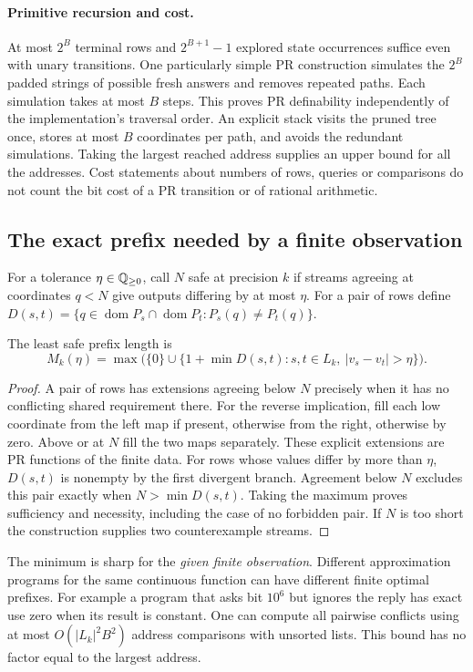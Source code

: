 \paragraph{Primitive recursion and cost.}
At most $2^B$ terminal rows and $2^{B+1}-1$ explored state occurrences suffice even with unary transitions. One particularly simple PR construction simulates the $2^B$ padded strings of possible fresh answers and removes repeated paths. Each simulation takes at most $B$ steps. This proves PR definability independently of the implementation's traversal order. An explicit stack visits the pruned tree once, stores at most $B$ coordinates per path, and avoids the redundant simulations. Taking the largest reached address supplies an upper bound for all the addresses. Cost statements about numbers of rows, queries or comparisons do not count the bit cost of a PR transition or of rational arithmetic.

\subsection{The exact prefix needed by a finite observation}
For a tolerance $\eta\in\mathbb{Q}_{\ge0}$, call $N$ safe at precision $k$ if streams agreeing at coordinates $q<N$ give outputs differing by at most $\eta$. For a pair of rows define $D(s,t)=\{q\in\operatorname{dom}P_s\cap\operatorname{dom}P_t:P_s(q)\ne P_t(q)\}$.
\begin{theorem}\label{thm:least}
The least safe prefix length is
\[
   M_k(\eta)=
   \max\bigl(\{0\}\cup
   \{1+\min D(s,t):s,t\in L_k,\ |v_s-v_t|>\eta\}\bigr).
\]
\end{theorem}
\begin{proof}
A pair of rows has extensions agreeing below $N$ precisely when it has no conflicting shared requirement there. For the reverse implication, fill each low coordinate from the left map if present, otherwise from the right, otherwise by zero. Above or at $N$ fill the two maps separately. These explicit extensions are PR functions of the finite data. For rows whose values differ by more than $\eta$, $D(s,t)$ is nonempty by the first divergent branch. Agreement below $N$ excludes this pair exactly when $N>\min D(s,t)$. Taking the maximum proves sufficiency and necessity, including the case of no forbidden pair. If $N$ is too short the construction supplies two counterexample streams.
\end{proof}
The minimum is sharp for the \emph{given finite observation}. Different approximation programs for the same continuous function can have different finite optimal prefixes. For example a program that asks bit $10^6$ but ignores the reply has exact use zero when its result is constant. One can compute all pairwise conflicts using at most $O(|L_k|^2 B^2)$ address comparisons with unsorted lists. This bound has no factor equal to the largest address.
